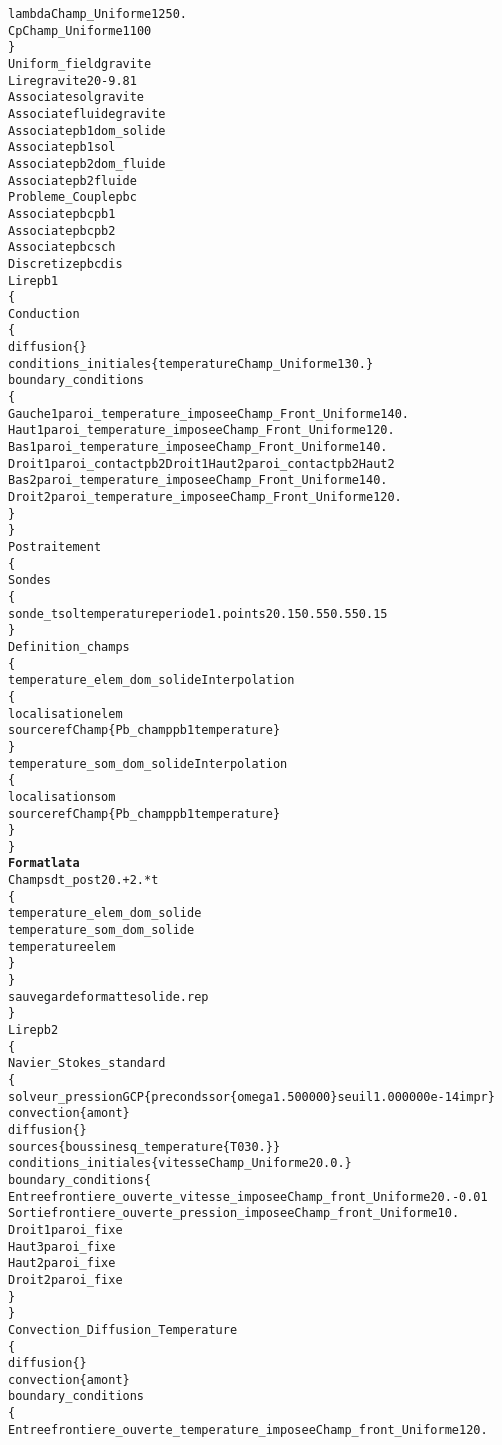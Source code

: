\begin{alltt}
    lambda Champ_Uniforme 1 250.
    Cp Champ_Uniforme 1 100
\}
Uniform_field gravite
Lire gravite 2 0 -9.81
Associate sol gravite
Associate fluide gravite
Associate pb1 dom_solide
Associate pb1 sol
Associate pb2 dom_fluide
Associate pb2 fluide
Probleme_Couple pbc
Associate pbc pb1
Associate pbc pb2
Associate pbc sch
Discretize pbc dis
Lire pb1
\{
    Conduction
    \{
        diffusion \{ \}
        conditions_initiales \{ temperature Champ_Uniforme 1 30. \}
        boundary_conditions
        \{
            Gauche1 paroi_temperature_imposee   Champ_Front_Uniforme 1 40.
            Haut1   paroi_temperature_imposee   Champ_Front_Uniforme 1 20.
            Bas1    paroi_temperature_imposee   Champ_Front_Uniforme 1 40.
            Droit1  paroi_contact pb2  Droit1   Haut2   paroi_contact pb2  Haut2
            Bas2    paroi_temperature_imposee   Champ_Front_Uniforme 1 40.
            Droit2  paroi_temperature_imposee   Champ_Front_Uniforme 1 20.
        \}
    \}
    Postraitement
    \{
        Sondes
        \{
            sonde_tsol temperature periode 1. points 2     0.15 0.55     0.55 0.15 
        \}
        Definition_champs 
        \{
            temperature_elem_dom_solide Interpolation
            \{
                localisation elem
                source refChamp \{ Pb_champ pb1 temperature \}
            \}
            temperature_som_dom_solide Interpolation 
            \{
                localisation som
                source refChamp \{ Pb_champ pb1 temperature \}
            \}
        \}
        {\bf{Format lata}}
        Champs dt_post 20.+2.*t
        \{
            temperature_elem_dom_solide
            temperature_som_dom_solide
            temperature elem
        \}
    \}
    sauvegarde formatte solide.rep
\}
Lire pb2
\{
    Navier_Stokes_standard
    \{
        solveur_pression GCP \{ precond ssor \{ omega 1.500000 \} seuil 1.000000e-14 impr \}
        convection \{ amont \}
        diffusion \{ \}
        sources \{ boussinesq_temperature \{ T0 30. \} \}
        conditions_initiales \{ vitesse Champ_Uniforme 2 0. 0. \}
        boundary_conditions \{
            Entree frontiere_ouverte_vitesse_imposee    Champ_front_Uniforme 2 0. -0.01
            Sortie frontiere_ouverte_pression_imposee   Champ_front_Uniforme 1 0.
            Droit1 paroi_fixe
            Haut3  paroi_fixe
            Haut2  paroi_fixe
            Droit2 paroi_fixe
        \}
    \}
    Convection_Diffusion_Temperature
    \{
        diffusion \{ \}
        convection \{ amont \}
        boundary_conditions 
        \{
            Entree frontiere_ouverte_temperature_imposee    Champ_front_Uniforme 1 20.

\end{alltt}
